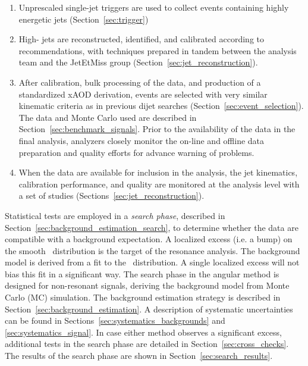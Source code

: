 \begin{enumerate}
\item Unprescaled single-jet triggers are used to collect events containing
highly energetic jets (Section~\ref{sec:trigger})
\item High-\pT\xspace jets are reconstructed, identified, and calibrated according to recommendations, with techniques
prepared in tandem between the analysis team and the
JetEtMiss group (Section~\ref{sec:jet_reconstruction}).
\item After calibration, bulk processing of the data, and production of a standardized xAOD derivation, events are selected with very similar kinematic 
criteria as in previous dijet searches (Section~\ref{sec:event_selection}). The data and Monte Carlo used are described in
Section~\ref{sec:benchmark_signals}. Prior to the availability of the data in the final
analysis, analyzers closely monitor the on-line and offline data preparation and
quality efforts for advance warning of problems.%
\item When the data are available for inclusion in the analysis, the jet kinematics, calibration performance, 
and quality are monitored at the analysis level with a set of studies (Sections~\ref{sec:jet_reconstruction}).
\end{enumerate}


Statistical tests are employed in a
\textit{search phase}, described in Section~\ref{sec:background_estimation_search}, to determine whether the 
data are compatible with a background expectation. 
A localized excess (i.e. a bump) on the smooth \mjj\  distribution
is the target of the resonance analysis.
The background model is derived from a fit to the \mjj\ distribution.
A single localized excess will not bias
this fit in a significant way. The
search phase in the angular method is designed for non-resonant
signals, deriving the background model from Monte Carlo (MC)
simulation. 
The background estimation strategy is described in Section~\ref{sec:background_estimation}.
A description of systematic uncertainties can be found in 
Sections~\ref{sec:systematics_backgrounds} and \ref{sec:systematics_signal}. 
In case either method observes a significant excess, additional tests in the search phase
are detailed in Section~\ref{sec:cross_checks}. The results of the
search phase are shown in Section~\ref{sec:search_results}.

